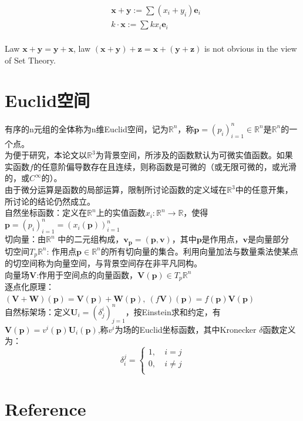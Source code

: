 \begin{equation}
    \begin{split}
    & \boldsymbol x + \boldsymbol y := \sum (x_i + y_i)\boldsymbol e_i\\
    & k \cdot \boldsymbol x := \sum kx_i\boldsymbol e_i\\
\end{split}
\end{equation}

Law $\boldsymbol{x} + \boldsymbol{y} = \boldsymbol{y} + \boldsymbol{x}$,
law $ (\boldsymbol{x} + \boldsymbol{y} )+ \boldsymbol{z} = \boldsymbol{x} +( \boldsymbol{y} + \boldsymbol{z})$ is not obvious in the view of Set Theory.




\section{Euclid空间}
有序的n元组的全体称为n维Euclid空间，记为$\mathbb R^n$，称$\boldsymbol p=(p_i)_{i=1}^n \in \mathbb R^n$是$\mathbb R^n$的一个点。\\
为便于研究，本论文以$ \mathbb R^3$为背景空间，所涉及的函数默认为可微实值函数。如果实函数$f$的任意阶偏导数存在且连续，则称函数是可微的（或无限可微的，或光滑的，或$C^\infty$的）。\\
由于微分运算是函数的局部运算，限制所讨论函数的定义域在$ \mathbb R^3$中的任意开集，所讨论的结论仍然成立。\\
自然坐标函数：定义在$\mathbb R^n$上的实值函数$x_i: \mathbb R^n \to  \mathbb R$，使得$\boldsymbol p=(p_i)_{i=1}^n = \left( x_i(\boldsymbol p) \right)_{i=1}^n   $\\
切向量：由$\mathbb R^n$ 中的二元组构成，$\boldsymbol v_{\boldsymbol p}=(\boldsymbol p,\boldsymbol v)$，其中$\boldsymbol p$是作用点，$\boldsymbol v$是向量部分\\
切空间$T_p  \mathbb R^n$: 作用点$\boldsymbol p \in \mathbb R^n$的所有切向量的集合。利用向量加法与数量乘法使某点的切空间称为向量空间，与背景空间存在非平凡同构。\\
向量场$\boldsymbol V$:作用于空间点的向量函数，$\boldsymbol V(\boldsymbol p)\in T_p  \mathbb R^n $\\
逐点化原理：$(\boldsymbol V+\boldsymbol W)(\boldsymbol p)=\boldsymbol V(\boldsymbol p)+\boldsymbol W(\boldsymbol p),\ (f \boldsymbol V)(\boldsymbol p)= f(\boldsymbol p)\boldsymbol V (\boldsymbol p)$\\
自然标架场：定义$\boldsymbol U_i=(\delta _j^i)_{j=1}^n$，按Einstein求和约定，有$\boldsymbol V(\boldsymbol p)=v^i(\boldsymbol p)\boldsymbol U_i(\boldsymbol p)$,称$v^i$为场的Euclid坐标函数，其中Kronecker $\delta$函数定义为：
\begin{equation}
\label{Kronecker_delta}
\delta _i^j=\left\{ 
    \begin{aligned}
    1,\  & i =j\\
    0,\  & i \neq j\\
    \end{aligned}
     \right.
\end{equation}

\section{Reference}








